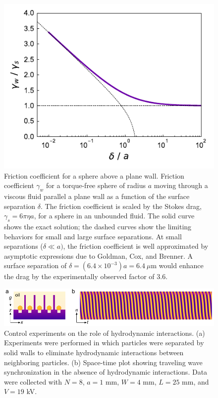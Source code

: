 \begin{appendices}
\begin{figure}[p]
    \centering
    \includegraphics{figures/A2_drafCoefficient.pdf}
    \caption{Friction coefficient for a sphere above a plane wall. Friction coefficient $\gamma_w$ for a torque-free sphere of radius $a$ moving through a viscous fluid parallel a plane wall as a function of the surface separation $\delta$.  The friction coefficient is scaled by the Stokes drag, $\gamma_s=6\pi \eta a$, for a sphere in an unbounded fluid.  The solid curve shows the exact solution\autocite{ONeill1964a,Dean1963}; the dashed curves show the limiting behaviors for small and large surface separations.  At small separations ($\delta\ll a)$, the friction coefficient is well approximated by asymptotic expressions due to Goldman, Cox, and Brenner\autocite{Goldman1967a}.  A surface separation of $\delta = (6.4\times10^{-3})a=6.4~\mu$m would enhance the drag by the experimentally observed factor of 3.6.}
    \label{fig:SI6}
\end{figure}


\begin{figure}[p]
    \centering
    \includegraphics{figures/A2_SI5-v2.pdf}
    \caption{Control experiments on the role of hydrodynamic interactions. (a) Experiments were performed in which particles were separated by solid walls to eliminate hydrodynamic interactions between neighboring particles. (b) Space-time plot showing traveling wave synchronization in the absence of hydrodynamic interactions. Data were collected with  $N=8$, $a=1$ mm, $W=4$ mm, $L=25$ mm, and $V=19$ kV.}
    \label{fig:SI6}
\end{figure}


\end{appendices}
